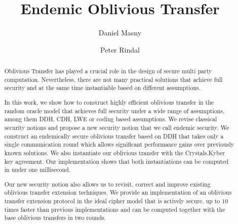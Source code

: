 \documentclass[10pt]{article}
\title{Endemic Oblivious Transfer}
\author{Daniel Masny \and Peter Rindal}
\institute{VISA Research}
\begin{document}
\maketitle

\begin{abstract}
Oblivious Transfer has played a crucial role in the design of secure multi party computation. Nevertheless, there are not many practical solutions that achieve full security and at the same time instantiable based on different assumptions.

In this work, we show how to construct highly efficient oblivious transfer in the random oracle model that achieves full security under a wide range of assumptions, among them DDH, CDH, LWE or coding based assumptions. We revise classical security notions and propose a new security notion that we call endemic security. We construct an endemically secure oblivious transfer based on DDH that takes only a single communication round which allows significant performance gains over previously known solutions. We also instantiate our oblivious transfer with the Crystals.Kyber key agreement. Our implementation shows that both instantiations can be computed in under one millisecond. 

Our new security notion also allows us to revisit, correct and improve existing oblivious transfer extension techniques. We provide an implementation of an oblivious transfer extension protocol in the ideal cipher model that is actively secure, up to $10$ times faster than previous implementations and can be computed together with the base oblivious transfers in two rounds.
\end{abstract}









% 






\appendix




%



%
\end{document}
